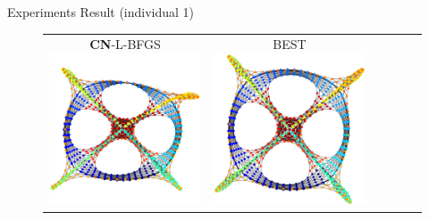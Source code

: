 \documentclass[dvipdfmx,13pt,aspectratio=169]{beamer}
\begin{document}
\begin{frame}{Experiments Result (individual 1)}
\begin{figure}[h]
\begin{tabular}{cccccc}
        \makecell{\small{\textsf{\textbf{CN}-L-BFGS}}                                                                                                       \\[-0.2em]\includegraphics[width=0.135\columnwidth]{../main/individual/vis/dwt_1005_CN-L-BFGS.png}} &
        \makecell{\small{\textsf{BEST}}                                                                                                                     \\[-0.2em]\includegraphics[width=0.135\columnwidth]{../main/individual/vis/opt_dwt_1005.png}} \\
      \end{tabular}
    \end{figure}
  \end{frame}
\fi
\end{document}
